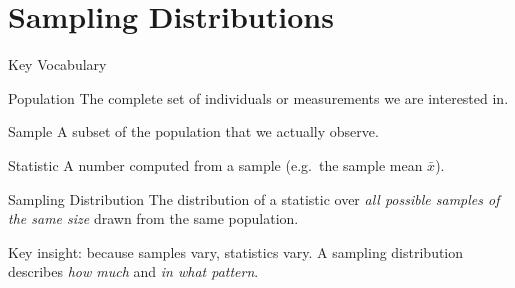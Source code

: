 \documentclass[aspectratio=169]{beamer}
\begin{document}
\section{Sampling Distributions}

\begin{frame}{Key Vocabulary}
    \begin{block}{Population}
        The complete set of individuals or measurements we are interested in.
    \end{block}
    \begin{block}{Sample}
        A subset of the population that we actually observe.
    \end{block}
    \begin{block}{Statistic}
        A number computed from a sample (e.g.\ the sample mean $\bar{x}$).
    \end{block}
    \begin{alertblock}{Sampling Distribution}
        The distribution of a statistic over \emph{all possible samples of the same size}
        drawn from the same population.
    \end{alertblock}
    \medskip
    \small Key insight: because samples vary, statistics vary. A sampling distribution
    describes \emph{how much} and \emph{in what pattern}.
\end{frame}
\end{document}
